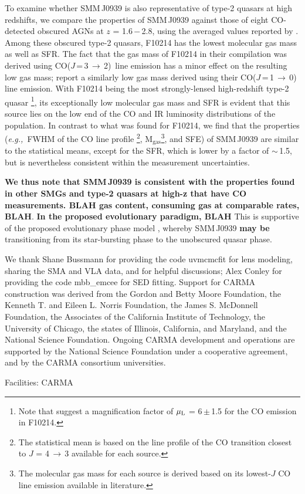 \documentclass[iop, revtex4]{emulateapj}
\newcommand{\rarr}{$\rightarrow$}
\newcommand{\CO}{\mbox{CO($J$\,=\,3\,$\rightarrow$\,2) }}
\newcommand{\eg}{{\sl e.g.,~}}
\begin{document}
To examine whether SMM\,J0939 is also representative of type-2 quasars at high redshifts, we compare the properties of SMM\,J0939
against those of eight CO-detected obscured AGNs at $z$ = 1.6\,$-$\,2.8, using the averaged values reported by \citet[][and references
therein]{Polletta11a}. 
Among these obscured type-2 quasars, F10214 has the lowest molecular gas mass as well as SFR. The fact that the gas mass of F10214 in their compilation was derived using \CO line emission \citep{Solomon05a} has a minor effect on the resulting low gas mass; \citet{Riechers11a} report
a similarly low gas mass derived using their CO($J$\,=\,1\,\rarr\,0) line emission.
With F10214 being the most strongly-lensed high-redshift type-2 quasar \citep[$\mu_{\textrm L}$ = 17; ][]{Solomon05a}\footnote{Note that \citet{Deane13a} suggest a magnification factor of $\mu_{\textrm L}$ = 6\,$\pm$\,1.5 for the CO emission in F10214.}, its exceptionally low molecular gas mass and SFR is evident that this source lies on the low end of the CO and IR luminosity distributions of the population.
In contrast to what was found for F10214, we find that the properties
(\eg FWHM of the CO line profile \footnote{The statistical mean is based on the line profile of the CO transition closest to $J$ = 4\,\rarr\,3 available for each source.}, M$_\textrm{gas}$\footnote{The molecular gas mass for each source is derived based on its lowest-$J$ CO line emission available in literature.}, and SFE) of SMM\,J0939 are similar to the statistical means, except for the SFR, which is lower by a
factor of $\sim$\,1.5, but is nevertheless consistent within the measurement uncertainties. 



{\bf We thus note that
 SMM\,J0939 is consistent with the properties found in other SMGs and type-2 quasars at high-z that have CO measurements.
 BLAH gas content, consuming gas at comparable rates, BLAH}.
{\bf In the proposed evolutionary paradigm, BLAH}
This is supportive of the proposed evolutionary phase model \citep[\eg][]{Sanders88,Coppin08a,Simpson12a}, whereby SMM\,J0939 {\bf may be} transitioning from its star-bursting phase to the unobscured quasar phase.


\begin{acknowledgments}
We thank Shane Bussmann for providing the code {\sc uvmcmcfit} for lens modeling, sharing the SMA and VLA data, and for helpful discussions; Alex Conley for providing the code {\sc mbb\_emcee} for SED fitting. 
Support for CARMA construction was derived from the
Gordon and Betty Moore Foundation, the Kenneth T. and Eileen
L. Norris Foundation, the James S. McDonnell Foundation, the
Associates of the California Institute of Technology, the University
of Chicago, the states of Illinois, California, and Maryland,
and the National Science Foundation. 
Ongoing CARMA development
and operations are supported by the National Science
Foundation under a cooperative agreement, and by the CARMA
consortium universities.

Facilities: CARMA
\end{acknowledgments}
\end{document}
